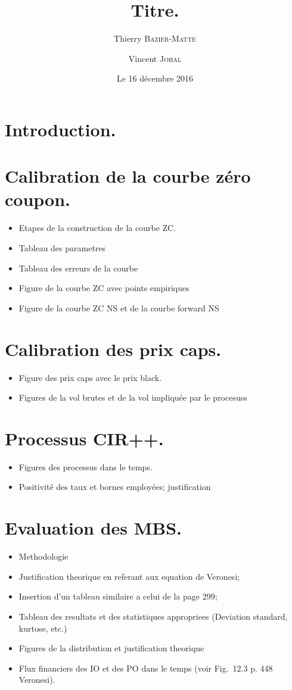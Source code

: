 \documentclass{article}
\title{Titre.}
\author{Thierry \textsc{Bazier-Matte} \and Vincent \textsc{Johal}}
\date{Le 16 décembre 2016}
\begin{document}
\maketitle

\section{Introduction.}

\section{Calibration de la courbe zéro coupon.}

\begin{itemize}
\item Etapes de la construction de la courbe ZC.
\item Tableau des parametres
\item Tableau des erreurs de la courbe
\item Figure de la courbe ZC avec points empiriques
\item Figure de la courbe ZC NS et de la courbe forward NS
\end{itemize}

\section{Calibration des prix caps.}

\begin{itemize}
\item Figure des prix caps avec le prix black.
\item Figures de la vol brutes et de la vol impliquée par le procesuss
\end{itemize}

\section{Processus CIR++.}
\begin{itemize}
\item Figures des processus dans le temps.
\item Positivité des taux et bornes employées; justification
\end{itemize}

\section{Evaluation des MBS.}
\begin{itemize}
\item Methodologie
\item Justification theorique en referant aux equation de Veronesi;
\item Insertion d'un tableau similaire a celui de la page 299;
\item Tableau des resultats et des statistiques appropriees (Deviation standard, kurtose,
  etc.)
\item Figures de la distribution et justification theorique
\item Flux financiers des IO et des PO dans le temps (voir Fig.~12.3 p. 448 Veronesi).
\end{itemize}
\end{document}
